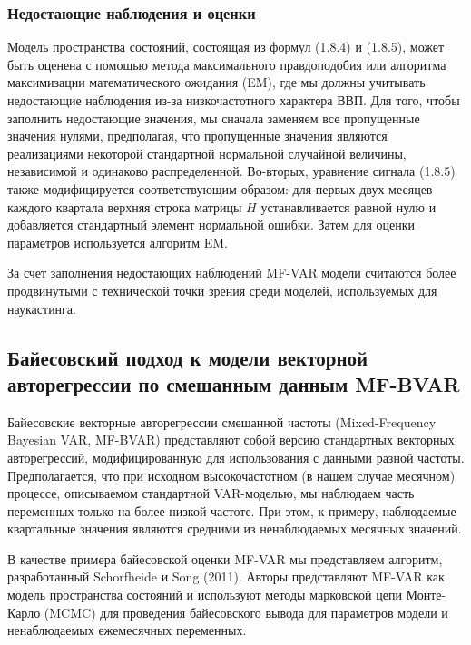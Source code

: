 \documentclass[a4paper, 12pt]{extarticle}
\numberwithin{equation}{subsection}
\begin{document}
	\subsubsection{Недостающие наблюдения и оценки}
	Модель пространства состояний, состоящая из формул (1.8.4) и (1.8.5), может быть оценена с помощью метода максимального правдоподобия или алгоритма максимизации математического ожидания (EM), где мы должны учитывать недостающие наблюдения из-за низкочастотного характера ВВП. Для того, чтобы заполнить недостающие значения, мы сначала заменяем все пропущенные значения нулями, предполагая, что пропущенные значения являются реализациями некоторой стандартной нормальной случайной величины, независимой и одинаково распределенной. Во-вторых, уравнение сигнала (1.8.5) также модифицируется соответствующим образом: для первых двух месяцев каждого квартала верхняя строка матрицы $H$ устанавливается равной нулю и добавляется стандартный элемент нормальной ошибки. Затем для оценки параметров используется алгоритм EM.
	
	За счет заполнения недостающих наблюдений MF-VAR модели считаются более продвинутыми с технической точки зрения среди моделей, используемых для наукастинга.
	\subsection{Байесовский подход к модели векторной авторегрессии по смешанным данным MF-BVAR}
	Байесовские векторные авторегрессии смешанной частоты (Mixed-Frequency Bayesian VAR, MF-BVAR) представляют собой версию стандартных векторных авторегрессий, модифицированную для использования с данными разной частоты. Предполагается, что при исходном высокочастотном (в нашем случае месячном) процессе, описываемом стандартной VAR-моделью, мы наблюдаем часть переменных только на более низкой частоте. При этом, к примеру, наблюдаемые квартальные значения являются средними из ненаблюдаемых месячных значений. 
	
	В качестве примера байесовской оценки MF-VAR мы представляем алгоритм, разработанный Schorfheide и Song (2011). Авторы представляют MF-VAR как
	модель пространства состояний и используют методы марковской цепи Монте-Карло (MCMC) для проведения байесовского вывода для
	параметров модели и ненаблюдаемых ежемесячных переменных. 
	
\end{document}
